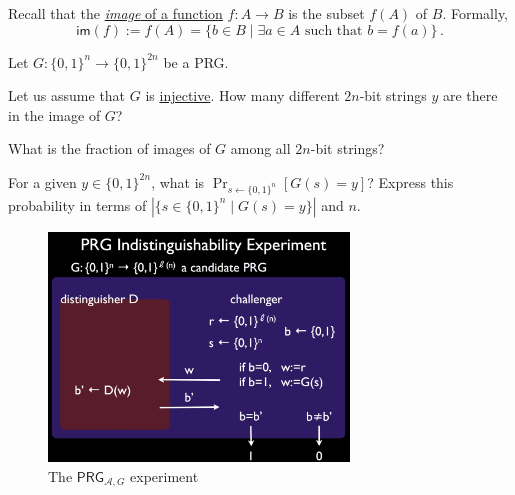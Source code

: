 \documentclass[a4paper,10pt,landscape,twocolumn]{scrartcl}
\begin{document}
\begin{exercise}
Recall that the \href{https://en.wikipedia.org/wiki/Image_(mathematics)}{\emph{image} of a function} $f:A \rightarrow B$ is the subset $f(A)$ of $B$. Formally, 
\[ \mathsf{im}(f) := f(A) = \{b \in B \mid \exists a \in A \mbox{ such that } b=f(a) \} \, .
\]

Let $G:\{0,1\}^n \rightarrow \{0,1\}^{2n}$ be a PRG. 

\begin{subex}
Let us assume that $G$ is \href{https://en.wikipedia.org/wiki/Injective_function}{injective}. How many different $2n$-bit strings $y$ are there in the image of $G$?
\end{subex}

\begin{subex}
What is the fraction of images of $G$ among all $2n$-bit strings?
\end{subex}

\begin{subex}
For a given $y \in \{0,1\}^{2n}$, what is $\Pr_{s \leftarrow
  \{0,1\}^n}[G(s) = y]$? Express this probability in terms of $|\{s \in \{0,1\}^n \mid G(s)=y\} |$ and $n$.
\end{subex}

\end{exercise}

\begin{figure}[h]
\center
\includegraphics[width=8cm]{PRGExperiment.jpg}
\caption{The $\mathsf{PRG}_{\mathcal{A},G}$ experiment \label{fig:prg-exp}}
\end{figure}
\end{document}
